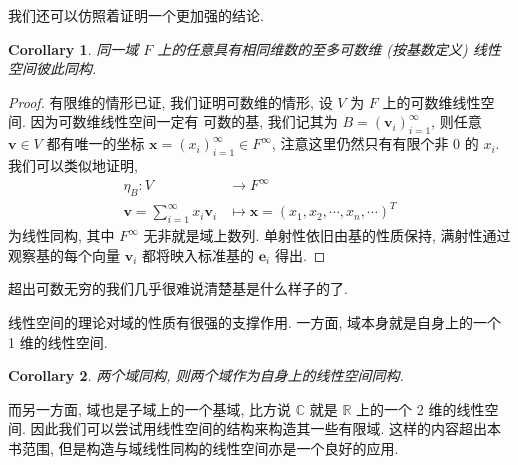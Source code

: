 \documentclass[UTF8]{book}
\newtheorem{corollary}{Corollary}[section]
\begin{document}
我们还可以仿照着证明一个更加强的结论. 

\begin{corollary}
    同一域 $F$ 上的任意具有相同维数的至多可数维 (按基数定义) 
    线性空间彼此同构. 
\end{corollary}

\begin{proof}
    有限维的情形已证, 我们证明可数维的情形, 设 $V$ 为 $F$ 上的可数维线性空间. 
    因为可数维线性空间一定有
    可数的基, 我们记其为 $B = (\boldsymbol{v}_i)_{i=1}^{\infty}$, 
    则任意 $\boldsymbol{v} \in V$ 都有唯一的坐标 
    $\boldsymbol{x} = (x_i)_{i=1}^{\infty} \in F^{\infty}$, 
    注意这里仍然只有有限个非 0 的 $x_i$. 
    我们可以类似地证明, 
    $$ \begin{aligned}
        \eta_B : V & \to F^{\infty} \\
        \boldsymbol{v} = \sum_{i=1}^{\infty} x_i \boldsymbol{v}_ i 
        &\mapsto \boldsymbol{x}=(x_1,x_2,\cdots,x_n,\cdots)^T
    \end{aligned}$$
    为线性同构, 其中 $F^{\infty}$ 无非就是域上数列. 
    单射性依旧由基的性质保持, 满射性通过观察基的每个向量 $\boldsymbol{v}_i$ 
    都将映入标准基的 $\boldsymbol{e}_i$ 得出. 
\end{proof}

超出可数无穷的我们几乎很难说清楚基是什么样子的了. 

线性空间的理论对域的性质有很强的支撑作用. 
一方面, 域本身就是自身上的一个 1 维的线性空间. 

\begin{corollary}
    两个域同构, 则两个域作为自身上的线性空间同构. 
\end{corollary}

而另一方面, 域也是子域上的一个基域, 
比方说 $\mathbb{C}$ 就是 $\mathbb{R}$ 上的一个 2 维的线性空间. 
因此我们可以尝试用线性空间的结构来构造其一些有限域. 
这样的内容超出本书范围, 但是构造与域线性同构的线性空间亦是一个良好的应用. 
\end{document}
